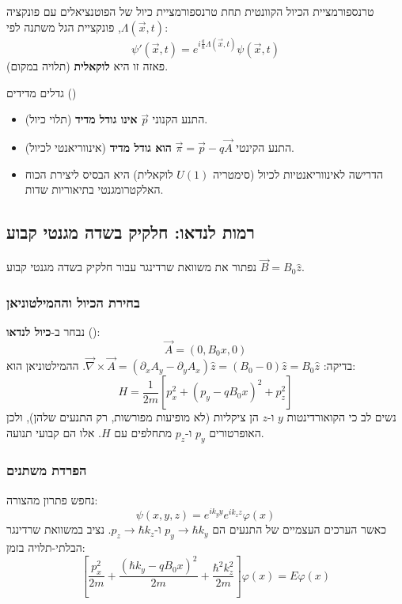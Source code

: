 \begin{resultbox}{טרנספורמציית הכיול הקוונטית}
תחת טרנספורמציית כיול של הפוטנציאלים עם פונקציה $\Lambda(\vec{x},t)$, פונקציית הגל משתנה לפי:
\begin{equation}
\psi'(\vec{x},t) = e^{i\frac{q}{\hbar}\Lambda(\vec{x},t)} \psi(\vec{x},t)
\end{equation}
פאזה זו היא \textbf{לוקאלית} (תלויה במקום).
\end{resultbox}

\begin{notebox}{גדלים מדידים ()}
\begin{itemize}
    \item התנע הקנוני $\vec{p}$ \textbf{אינו גודל מדיד} (תלוי כיול).
    \item התנע הקינטי $\vec{\pi} = \vec{p} - q\vec{A}$ \textbf{הוא גודל מדיד} (אינווריאנטי לכיול).
    \item הדרישה לאינווריאנטיות לכיול (סימטריה $U(1)$ לוקאלית) היא הבסיס ליצירת הכוח האלקטרומגנטי בתיאוריות שדות.
\end{itemize}
\end{notebox}

\subsection{רמות לנדאו: חלקיק בשדה מגנטי קבוע}

נפתור את משוואת שרדינגר עבור חלקיק בשדה מגנטי קבוע $\vec{B} = B_0 \hat{z}$.

\subsubsection*{בחירת הכיול וההמילטוניאן}
נבחר ב-\textbf{כיול לנדאו} ():
\begin{equation}
\vec{A} = (0, B_0 x, 0)
\end{equation}
בדיקה: $\vec{\nabla} \times \vec{A} = (\partial_x A_y - \partial_y A_x)\hat{z} = (B_0 - 0)\hat{z} = B_0\hat{z}$.
ההמילטוניאן הוא:
\begin{equation}
H = \frac{1}{2m} \left[ p_x^2 + (p_y - q B_0 x)^2 + p_z^2 \right]
\end{equation}
נשים לב כי הקואורדינטות $y$ ו-$z$ הן ציקליות (לא מופיעות מפורשות, רק התנעים שלהן), ולכן האופרטורים $p_y$ ו-$p_z$ מתחלפים עם $H$. אלו הם קבועי תנועה.

\subsubsection*{הפרדת משתנים}
נחפש פתרון מהצורה:
\begin{equation}
\psi(x,y,z) = e^{ik_y y} e^{ik_z z} \varphi(x)
\end{equation}
כאשר הערכים העצמיים של התנעים הם $p_y \to \hbar k_y$ ו-$p_z \to \hbar k_z$.
נציב במשוואת שרדינגר הבלתי-תלויה בזמן:
\begin{equation}
\left[ \frac{p_x^2}{2m} + \frac{(\hbar k_y - q B_0 x)^2}{2m} + \frac{\hbar^2 k_z^2}{2m} \right] \varphi(x) = E \varphi(x)
\end{equation}

